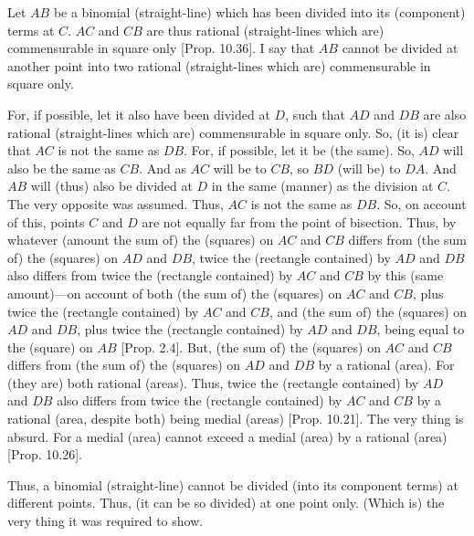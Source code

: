 \begin{Parallel}{}{}
{Let $AB$ be a binomial (straight-line) which has been divided into its
(component) terms at $C$. $AC$ and $CB$ are thus
rational (straight-lines which are) commensurable in square only [Prop. 10.36]. I say that $AB$ cannot be divided
at another point
into two rational (straight-lines which are) commensurable in square only.

For, if possible, let it also have been divided at $D$, such that $AD$ and
$DB$ are also rational (straight-lines which are) commensurable in
square only. So, (it is) clear that $AC$ is not the same as $DB$.
For, if possible, let it be (the same). So, $AD$ will also be the same
as $CB$. And as $AC$ will be to $CB$, so $BD$ (will be) to $DA$.
And $AB$ will (thus) also be divided at $D$ in the same (manner) as the division at $C$. The very opposite was assumed. Thus, $AC$ is not the
same as $DB$. So, on account of this,  points $C$ and $D$ are
not equally far from the point of bisection. Thus, by whatever (amount the sum of) the (squares) on $AC$ and $CB$ differs from (the sum of) the
(squares) on $AD$ and $DB$, twice the (rectangle contained)
by $AD$ and $DB$ also differs from twice the (rectangle contained)
by $AC$ and $CB$ by this (same amount)---on account of both (the sum of) the (squares) on $AC$ and
$CB$, plus twice the (rectangle contained) by $AC$ and $CB$, and
(the sum of) the (squares) on $AD$ and $DB$, plus twice the
(rectangle contained) by $AD$ and $DB$,  being equal to the (square) on $AB$ [Prop. 2.4]. But, (the sum of) the
(squares) on  $AC$ and $CB$ differs from (the sum of) the (squares)
on $AD$ and $DB$ by a rational (area). For (they are) both rational (areas).
Thus, twice the (rectangle contained) by $AD$ and $DB$ also differs from
twice the (rectangle contained) by $AC$ and $CB$ by a
rational (area, despite both) being medial (areas) [Prop. 10.21]. The very thing is absurd. For a
medial (area) cannot exceed a medial (area) by a rational (area) [Prop. 10.26].

Thus, a binomial (straight-line) cannot be divided (into its component terms) at different points.
Thus, (it can be so divided) at one point only. (Which is) the very thing it
was required to show.}
\end{Parallel}




